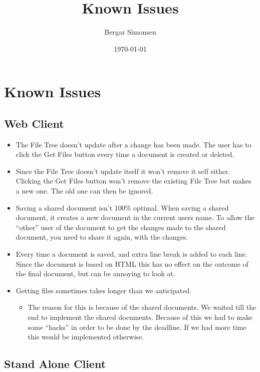 \documentclass[11pt]{article}
\title{Known Issues}
\author{Bergar Simonsen}
\date{\today}
\begin{document}
\maketitle

\setcounter{tocdepth}{3}
\tableofcontents
\vspace*{1cm}
\section{Known Issues}
\label{sec-1}
\subsection{Web Client}
\label{sec-1-1}

\begin{itemize}
\item The File Tree doesn't update after a change has been made. The user has to click the 
     Get Files button every time a document is created or deleted.
\item Since the File Tree doesn't update itself it won't remove it self either. Clicking
     the Get Files button won't remove the existing File Tree but makes a new one. 
     The old one can then be ignored.
\item Saving a shared document isn't 100\% optimal. 
     When saving a shared document, it creates a new document in the current users 
     name. To allow the ``other'' user of the document to get the changes made to
     the shared document, you need to share it again, with the changes.
\item Every time a document is saved, and extra line break is added to each line. Since
     the document is based on HTML this has no effect on the outcome of the final 
     document, but can be annoying to look at.
\item Getting files sometimes takes longer than we anticipated.
\begin{itemize}
\item The reason for this is because of the shared documents. We waited till the end 
       to implement the shared documents. Because of this we had to make some ``hacks''
       in order to be done by the deadline.
       If we had more time this would be implemented otherwise.
\end{itemize}
\end{itemize}
\subsection{Stand Alone Client}
\label{sec-1-2}
\end{document}

